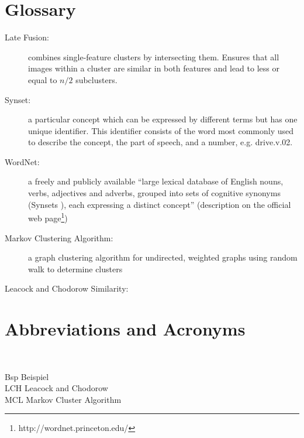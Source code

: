 \section{Glossary} %

\begin{description}
\item[Late Fusion:] combines single-feature clusters by intersecting them. Ensures that all images within a cluster are similar in both features and lead to less or equal to $n/2$ subclusters.

\item[Synset:] a particular concept which can be expressed by different terms but has one unique identifier. This identifier consists of the word most commonly used to describe the concept, the part of speech, and a number, e.g. drive.v.02.

\item[WordNet:] a freely and publicly available ``large lexical database of English nouns, verbs, adjectives and adverbs, grouped into sets of cognitive synonyms (Synsets ), each expressing a distinct concept'' (description on the official web page\footnote{http://wordnet.princeton.edu/})

\item[Markov Clustering Algorithm:] a graph clustering algorithm for undirected, weighted graphs using random walk to determine clusters

\item[Leacock and Chodorow Similarity:]
\end{description}


\newpage

\section{Abbreviations and Acronyms}

\begin{tabbing}
\hspace*{3cm}\=  \\ \kill

Bsp \> Beispiel\\
LCH \> Leacock and Chodorow\\
MCL \> Markov Cluster Algorithm\\

\end{tabbing}
